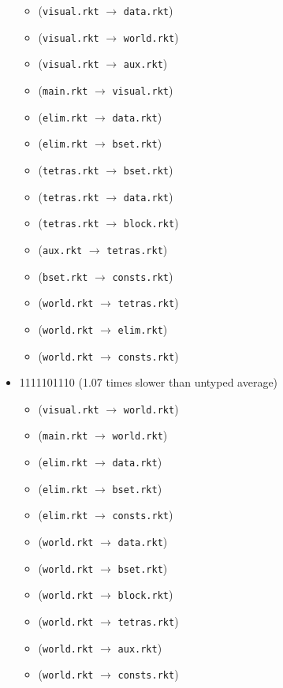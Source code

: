 \documentclass{article}
\newcommand{\mono}[1]{\texttt{#1}}
\begin{document}
\begin{itemize}
\begin{itemize}
  \item (\mono{visual.rkt} $\rightarrow$ \mono{data.rkt})
  \item (\mono{visual.rkt} $\rightarrow$ \mono{world.rkt})
  \item (\mono{visual.rkt} $\rightarrow$ \mono{aux.rkt})
  \item (\mono{main.rkt} $\rightarrow$ \mono{visual.rkt})
  \item (\mono{elim.rkt} $\rightarrow$ \mono{data.rkt})
  \item (\mono{elim.rkt} $\rightarrow$ \mono{bset.rkt})
  \item (\mono{tetras.rkt} $\rightarrow$ \mono{bset.rkt})
  \item (\mono{tetras.rkt} $\rightarrow$ \mono{data.rkt})
  \item (\mono{tetras.rkt} $\rightarrow$ \mono{block.rkt})
  \item (\mono{aux.rkt} $\rightarrow$ \mono{tetras.rkt})
  \item (\mono{bset.rkt} $\rightarrow$ \mono{consts.rkt})
  \item (\mono{world.rkt} $\rightarrow$ \mono{tetras.rkt})
  \item (\mono{world.rkt} $\rightarrow$ \mono{elim.rkt})
  \item (\mono{world.rkt} $\rightarrow$ \mono{consts.rkt})
  \end{itemize}
\item 1111101110 (1.07 times slower than untyped average)
  \begin{itemize}
  \item (\mono{visual.rkt} $\rightarrow$ \mono{world.rkt})
  \item (\mono{main.rkt} $\rightarrow$ \mono{world.rkt})
  \item (\mono{elim.rkt} $\rightarrow$ \mono{data.rkt})
  \item (\mono{elim.rkt} $\rightarrow$ \mono{bset.rkt})
  \item (\mono{elim.rkt} $\rightarrow$ \mono{consts.rkt})
  \item (\mono{world.rkt} $\rightarrow$ \mono{data.rkt})
  \item (\mono{world.rkt} $\rightarrow$ \mono{bset.rkt})
  \item (\mono{world.rkt} $\rightarrow$ \mono{block.rkt})
  \item (\mono{world.rkt} $\rightarrow$ \mono{tetras.rkt})
  \item (\mono{world.rkt} $\rightarrow$ \mono{aux.rkt})
  \item (\mono{world.rkt} $\rightarrow$ \mono{consts.rkt})

\end{itemize}
\end{itemize}
\end{document}
